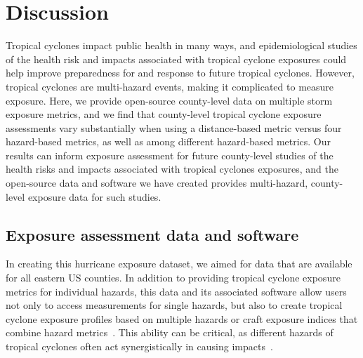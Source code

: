 \section*{Discussion}

Tropical cyclones impact public health in many ways, and epidemiological
studies of the health risk and impacts associated with tropical cyclone
exposures could help improve preparedness for and response to future tropical
cyclones.  However, tropical cyclones are multi-hazard events, making it
complicated to measure exposure. Here, we provide open-source county-level data
on multiple storm exposure metrics, and we find that county-level tropical
cyclone exposure assessments vary substantially when using a distance-based
metric versus four hazard-based metrics, as well as among different
hazard-based metrics. Our results can inform exposure assessment for future
county-level studies of the health risks and impacts associated with tropical
cyclones exposures, and the open-source data and software we have created
provides multi-hazard, county-level exposure data for such studies.

\subsection*{Exposure assessment data and software}

In creating this hurricane exposure dataset, we aimed for data that are
available for all eastern \ac{US} counties. In addition to providing tropical
cyclone exposure metrics for individual hazards, this data and its associated
software allow users not only to access measurements for single hazards, but
also to create tropical cyclone exposure profiles based on multiple hazards or
craft exposure indices that combine hazard
metrics~\parencite{chakraborty2005population, peduzzi2009assessing}. This
ability can be critical, as different hazards of tropical cyclones often act
synergistically in causing impacts~\parencite{smith2009}.  

\begin{comment}
To assist with future tropical cyclone studies, we created and published open
source software with this dataset and accompanying
tools~\parencite{hurricaneexposuredata, hurricaneexposure}.  Many previous
studies have used geographical information system software (e.g., ArcGIS) to
assess exposure to tropical cyclones in the \ac{US}~\parencite{grabich2016,
zandbergen2009, czajkowski2011, kruk2010}.  Here, we offer methods to map and
output historic exposure to tropical cyclones that does not require the use of
proprietary software but instead uses a package written in the R statistical
programming language~\parencite{R}, which is free and open-source.  Further, by
including measurements of different hazard exposures in each county for each
tropical cyclone, this software allows for the development of more complex
exposure indices or models (e.g., random forests, multivariable generalized
linear models) that incorporate multiple tropical cyclone hazard measurements.  
\end{comment}

